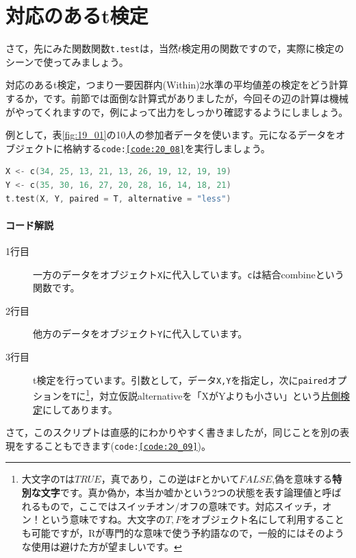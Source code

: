 \documentclass{ltjsbook}
\begin{document}
\section{対応のあるt検定}
さて，先にみた関数関数\texttt{t.test}は，当然$t$検定用の関数ですので，実際に検定のシーンで使ってみましょう。

対応のあるt検定，つまり一要因群内(Within)2水準の平均値差の検定をどう計算するか，です。前節では面倒な計算式がありましたが，今回その辺の計算は機械がやってくれますので，例によって出力をしっかり確認するようにしましょう。

例として，表\ref{fig:19_01}の10人の参加者データを使います。元になるデータをオブジェクトに格納する\texttt{code:\ref{code:20_08}}を実行しましょう。
\begin{lstlisting}[language=c++,label={code:20_08},caption={t検定を行う}]
X <- c(34, 25, 13, 21, 13, 26, 19, 12, 19, 19)
Y <- c(35, 30, 16, 27, 20, 28, 16, 14, 18, 21)
t.test(X, Y, paired = T, alternative = "less")
\end{lstlisting}

\paragraph{コード解説}
\begin{description}
	\item[1行目] 一方のデータをオブジェクト\texttt{X}に代入しています。\texttt{c}は結合combineという関数です。
	\item[2行目] 他方のデータをオブジェクト\texttt{Y}に代入しています。
	\item[3行目] t検定を行っています。引数として，データ\texttt{X,Y}を指定し，次に\texttt{paired}オプションを\texttt{T}に\footnote{大文字の\texttt{T}は$TRUE$，真であり，この逆は\texttt{F}とかいて$FALSE$,偽を意味する\textbf{特別な文字}です。真か偽か，本当か嘘かという2つの状態を表す論理値と呼ばれるもので，ここではスイッチオン/オフの意味です。対応スイッチ，オン！という意味ですね。大文字の$T,F$をオブジェクト名にして利用することも可能ですが，Rが専門的な意味で使う予約語なので，一般的にはそのような使用は避けた方が望ましいです。}，対立仮説alternativeを「XがYよりも小さい」という\underline{片側検定}にしてあります。
\end{description}
さて，このスクリプトは直感的にわかりやすく書きましたが，同じことを別の表現をすることもできます(\texttt{code:\ref{code:20_09}})。
\end{document}
